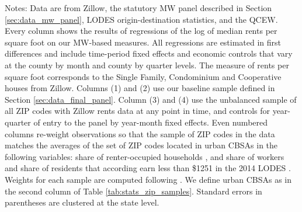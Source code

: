 \begin{table}[hbt!]
    \begin{minipage}{.95\linewidth} \footnotesize
        \vspace{2mm}
        Notes:
        Data are from Zillow,
        the statutory MW panel described in Section \ref{sec:data_mw_panel},
        LODES origin-destination statistics, and the QCEW.
        Every column shows the results of regressions of the log of
        median rents per square foot on our MW-based measures.
        All regressions are estimated in first differences and include 
        time-period fixed effects and economic controls that vary at the 
        county by month and county by quarter levels.
        The measure of rents per square foot corresponds to the Single Family, 
        Condominium and Cooperative houses from Zillow.
        Columns (1) and (2) use our baseline sample defined in Section 
        \ref{sec:data_final_panel}.
        Column (3) and (4) use the unbalanced sample of all ZIP codes with 
        Zillow rents data at any point in time, and controls for year-quarter of 
        entry to the panel by year-month fixed effects.
        Even numbered columns re-weight observations so that the sample of 
        ZIP codes in the data matches the averages of the set of ZIP codes
        located in urban CBSAs in the following variables:
        share of renter-occupied households \parencite{CensusDecennial}, and share of 
        workers and share of residents that according earn less than \$1251 in
        the 2014 LODES \parencite{CensusLODES}.
        Weights for each sample are computed following \textcite{Hainmueller2012}.
        We define urban CBSAs as in the second column of Table 
        \ref{tab:stats_zip_samples}.
        Standard errors in parentheses are clustered at the state level.
    \end{minipage}
\end{table}
